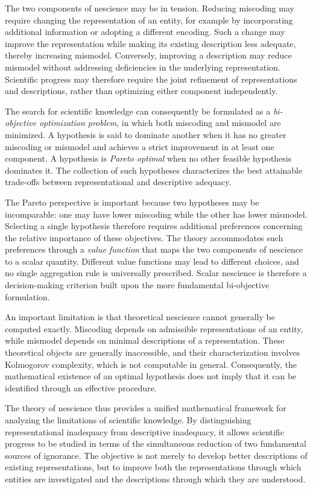 The two components of nescience may be in tension. Reducing miscoding may require changing the representation of an entity, for example by incorporating additional information or adopting a different encoding. Such a change may improve the representation while making its existing description less adequate, thereby increasing mismodel. Conversely, improving a description may reduce mismodel without addressing deficiencies in the underlying representation. Scientific progress may therefore require the joint refinement of representations and descriptions, rather than optimizing either component independently.

The search for scientific knowledge can consequently be formulated as a \emph{bi-objective optimization problem}, in which both miscoding and mismodel are minimized. A hypothesis is said to dominate another when it has no greater miscoding or mismodel and achieves a strict improvement in at least one component. A hypothesis is \emph{Pareto optimal} when no other feasible hypothesis dominates it. The collection of such hypotheses characterizes the best attainable trade-offs between representational and descriptive adequacy.

The Pareto perspective is important because two hypotheses may be incomparable: one may have lower miscoding while the other has lower mismodel. Selecting a single hypothesis therefore requires additional preferences concerning the relative importance of these objectives. The theory accommodates such preferences through a \emph{value function} that maps the two components of nescience to a scalar quantity. Different value functions may lead to different choices, and no single aggregation rule is universally prescribed. Scalar nescience is therefore a decision-making criterion built upon the more fundamental bi-objective formulation.

An important limitation is that theoretical nescience cannot generally be computed exactly. Miscoding depends on admissible representations of an entity, while mismodel depends on minimal descriptions of a representation. These theoretical objects are generally inaccessible, and their characterization involves Kolmogorov complexity, which is not computable in general. Consequently, the mathematical existence of an optimal hypothesis does not imply that it can be identified through an effective procedure.

The theory of nescience thus provides a unified mathematical framework for analyzing the limitations of scientific knowledge. By distinguishing representational inadequacy from descriptive inadequacy, it allows scientific progress to be studied in terms of the simultaneous reduction of two fundamental sources of ignorance. The objective is not merely to develop better descriptions of existing representations, but to improve both the representations through which entities are investigated and the descriptions through which they are understood.


